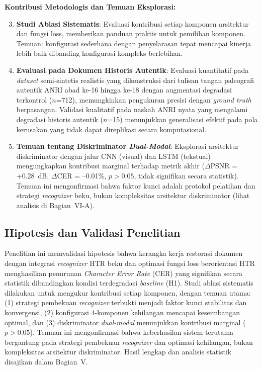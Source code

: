 \documentclass[journal]{IEEEtran}
\begin{document}
\textbf{Kontribusi Metodologis dan Temuan Eksplorasi:}
\begin{enumerate}
    \setcounter{enumi}{2}
    \item \textbf{Studi Ablasi Sistematis}: Evaluasi kontribusi setiap komponen arsitektur dan fungsi loss, memberikan panduan praktis untuk pemilihan komponen. Temuan: konfigurasi sederhana dengan penyelarasan tepat mencapai kinerja lebih baik dibanding konfigurasi kompleks berlebihan.
    
    \item \textbf{Evaluasi pada Dokumen Historis Autentik}: Evaluasi kuantitatif pada \textit{dataset} semi-sintetis realistis yang dikonstruksi dari tulisan tangan paleografi autentik ANRI abad ke-16 hingga ke-18 dengan augmentasi degradasi terkontrol ($n$=712), memungkinkan pengukuran presisi dengan \textit{ground truth} berpasangan. Validasi kualitatif pada naskah ANRI nyata yang mengalami degradasi historis autentik ($n$=15) menunjukkan generalisasi efektif pada pola kerusakan yang tidak dapat direplikasi secara komputasional.
    
    \item \textbf{Temuan tentang Diskriminator \textit{Dual-Modal}}: Eksplorasi arsitektur diskriminator dengan jalur CNN (visual) dan LSTM (tekstual) mengungkapkan kontribusi marginal terhadap metrik akhir ($\Delta$PSNR = +0.28~dB, $\Delta$CER = --0.01\%, $p>0.05$, tidak signifikan secara statistik). Temuan ini mengonfirmasi bahwa faktor kunci adalah protokol pelatihan dan strategi \textit{recognizer} beku, bukan kompleksitas arsitektur diskriminator (lihat analisis di Bagian~VI-A).
\end{enumerate}

\subsection{Hipotesis dan Validasi Penelitian}

Penelitian ini memvalidasi hipotesis bahwa kerangka kerja restorasi dokumen dengan integrasi \textit{recognizer} HTR beku dan optimasi fungsi loss berorientasi HTR menghasilkan penurunan \textit{Character Error Rate} (CER) yang signifikan secara statistik dibandingkan kondisi terdegradasi \textit{baseline} (H1). Studi ablasi sistematis dilakukan untuk mengukur kontribusi setiap komponen, dengan temuan utama: (1) strategi pembekuan \textit{recognizer} terbukti menjadi faktor kunci stabilitas dan konvergensi, (2) konfigurasi 4-komponen kehilangan mencapai keseimbangan optimal, dan (3) diskriminator \textit{dual-modal} menunjukkan kontribusi marginal ($p>0.05$). Temuan ini mengonfirmasi bahwa keberhasilan sistem terutama bergantung pada strategi pembekuan \textit{recognizer} dan optimasi kehilangan, bukan kompleksitas arsitektur diskriminator. Hasil lengkap dan analisis statistik disajikan dalam Bagian~V.
\end{document}
